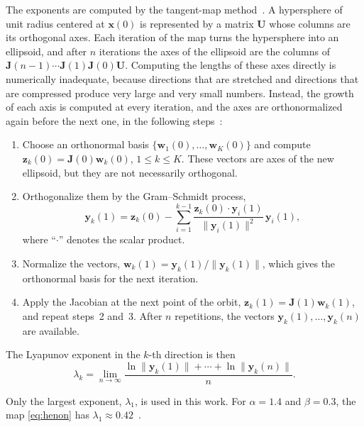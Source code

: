 \documentclass[journal]{IEEEtran}
\begin{document}
The exponents are computed by the tangent-map
method~\cite{Alligood1996,Borges2022sbrt}. A hypersphere of unit radius
centered at $\mathbf{x}(0)$ is represented by a matrix $\mathbf{U}$ whose
columns are its orthogonal axes. Each iteration of the map turns the
hypersphere into an ellipsoid, and after $n$ iterations the axes of the
ellipsoid are the columns of
$\mathbf{J}(n-1)\cdots\mathbf{J}(1)\mathbf{J}(0)\mathbf{U}$. Computing the
lengths of these axes directly is numerically inadequate, because directions
that are stretched and directions that are compressed produce very large and
very small numbers. Instead, the growth of each axis is computed at every
iteration, and the axes are orthonormalized again before the next one, in the
following steps~\cite{Alligood1996}:
\begin{enumerate}
  \item Choose an orthonormal basis $\{\mathbf{w}_1(0),\ldots,\mathbf{w}_K(0)\}$
  and compute $\mathbf{z}_k(0)=\mathbf{J}(0)\mathbf{w}_k(0)$, $1\le k\le K$.
  These vectors are axes of the new ellipsoid, but they are not necessarily
  orthogonal.
  \item Orthogonalize them by the Gram--Schmidt process,
  \begin{equation}
    \mathbf{y}_k(1)=\mathbf{z}_k(0)-\sum_{i=1}^{k-1}
    \frac{\mathbf{z}_k(0)\cdot\mathbf{y}_i(1)}{\|\mathbf{y}_i(1)\|^2}\,
    \mathbf{y}_i(1),
    \label{eq:gs}
  \end{equation}
  where ``$\cdot$'' denotes the scalar product.
  \item Normalize the vectors, $\mathbf{w}_k(1)=\mathbf{y}_k(1)/\|\mathbf{y}_k(1)\|$,
  which gives the orthonormal basis for the next iteration.
  \item Apply the Jacobian at the next point of the orbit,
  $\mathbf{z}_k(1)=\mathbf{J}(1)\mathbf{w}_k(1)$, and repeat steps~2 and~3.
  After $n$ repetitions, the vectors $\mathbf{y}_k(1),\ldots,\mathbf{y}_k(n)$
  are available.
\end{enumerate}
The Lyapunov exponent in the $k$-th direction is then
\begin{equation}
  \lambda_k = \lim_{n\to\infty}
  \frac{\ln\|\mathbf{y}_k(1)\| + \cdots + \ln\|\mathbf{y}_k(n)\|}{n}.
  \label{eq:lyap}
\end{equation}

Only the largest exponent, $\lambda_1$, is used in this work. For
$\alpha=1.4$ and $\beta=0.3$, the map
\eqref{eq:henon} has
$\lambda_1\approx0.42$~\cite{Sprott2003}.
\end{document}
